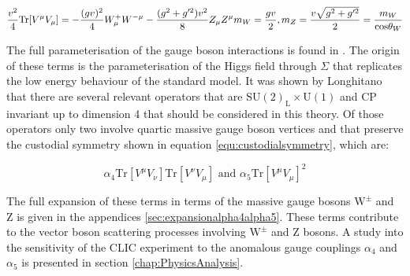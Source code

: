 \begin{equation}
\frac{v^{2}}{4}\text{Tr}[V^{\mu}V_{\mu}] = - \frac{(gv)^{2}}{4} W^{+}_{\mu} W^{-\mu} - \frac{(g^{2} + g'^{2})v^{2}}{8} Z_{\mu} Z^{\mu} \\
m_{W} = \frac{gv}{2}, m_{Z} = \frac{v\sqrt{g^{2} + g'^{2}}}{2} = \frac{m_{W}}{\text{cos}{\theta_{W}}}
\end{equation}

The full parameterisation of the gauge boson interactions is found in \cite{Herrero:1994tj}.  The origin of these terms is the parameterisation of the Higgs field through $\Sigma$ that replicates the low energy behaviour of the standard model.  It was shown by Longhitano \cite{Longhitano:1980tm} that there are several relevant operators that are $\text{SU}(2)_{\text{L}} \times \text{U}(1)$ and CP invariant up to dimension 4 that should be considered in this theory.  Of those operators only two involve quartic massive gauge boson vertices and that preserve the custodial symmetry \cite{Belyaev:354051} shown in equation \ref{equ:custodialsymmetry}, which are:

\begin{equation}
\alpha_{4}\text{Tr}[V^{\mu}V_{\nu}]\text{Tr}[V^{\nu}V_{\mu}] \text{ and } \alpha_{5}\text{Tr}[V^{\mu}V_{\mu}]^{2}
\end{equation}

The full expansion of these terms in terms of the massive gauge bosons $\text{W}^{\pm}$ and Z is given in the appendices \ref{sec:expansionalpha4alpha5}.  These terms contribute to the vector boson scattering processes involving $\text{W}^{\pm}$ and Z bosons.  A study into the sensitivity of the CLIC experiment to the anomalous gauge couplings $\alpha_{4}$ and $\alpha_{5}$ is presented in section \ref{chap:PhysicsAnalysis}.



